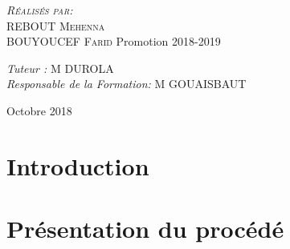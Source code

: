 \documentclass[12pt, a4paper, openany]{report}
\begin{document}
\begin{titlepage}
\begin{sffamily}
\begin{center}
    \begin{minipage}{0.4\textwidth}
      \begin{flushleft} \large
         \textsc{\emph {Réalisés par:} \\REBOUT Mehenna}\\
         \textsc{BOUYOUCEF Farid}   
          \newline
          Promotion 2018-2019 \\
      \end{flushleft}
    \end{minipage}
    \begin{minipage}{0.4\textwidth}
      \begin{flushright} \large
        \emph{Tuteur :}  \textsc{M DUROLA}\\
        \emph{Responsable de la Formation:} \textsc{M GOUAISBAUT}
      \end{flushright}
    \end{minipage}

    \vfill

    {\large Octobre 2018}

  \end{center}
  \end{sffamily}      
          
  \end{titlepage}
  
\makeatother




   
\renewcommand{\contentsname}{Sommaire}
\tableofcontents



\chapter*{Introduction}



 
 
    
 \chapter{Présentation du procédé}                                                
\end{document}
